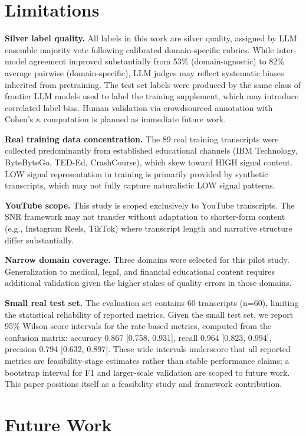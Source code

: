 \documentclass[11pt,a4paper]{article}
\begin{document}
\section{Limitations}

\textbf{Silver label quality.} All labels in this work are silver quality, assigned by LLM
ensemble majority vote following calibrated domain-specific rubrics. While inter-model agreement
improved substantially from 53\% (domain-agnostic) to 82\% average pairwise (domain-specific),
LLM judges may reflect systematic biases inherited from pretraining. The test set labels were
produced by the same class of frontier LLM models used to label the training supplement, which
may introduce correlated label bias. Human validation via crowdsourced annotation with Cohen's
$\kappa$ computation is planned as immediate future work.

\textbf{Real training data concentration.} The 89 real training transcripts were collected
predominantly from established educational channels (IBM Technology, ByteByteGo, TED-Ed,
CrashCourse), which skew toward HIGH signal content. LOW signal representation in training is
primarily provided by synthetic transcripts, which may not fully capture naturalistic LOW signal
patterns.

\textbf{YouTube scope.} This study is scoped exclusively to YouTube transcripts. The SNR
framework may not transfer without adaptation to shorter-form content (e.g., Instagram Reels,
TikTok) where transcript length and narrative structure differ substantially.

\textbf{Narrow domain coverage.} Three domains were selected for this pilot study.
Generalization to medical, legal, and financial educational content requires additional
validation given the higher stakes of quality errors in those domains.

\textbf{Small real test set.} The evaluation set contains 60 transcripts (n=60), limiting the
statistical reliability of reported metrics. Given the small test set, we report 95\% Wilson
score intervals for the rate-based metrics, computed from the confusion matrix: accuracy 0.867
[0.758, 0.931], recall 0.964 [0.823, 0.994], precision 0.794 [0.632, 0.897]. These wide
intervals underscore that all reported metrics are feasibility-stage estimates rather than stable
performance claims; a bootstrap interval for F1 and larger-scale validation are scoped to future
work. This paper positions itself as a feasibility study and framework contribution.

\section{Future Work}
\end{document}

